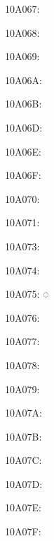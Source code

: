 \begin{multicols}{4}
10A067: 􊁧

10A068: 􊁨

10A069: 􊁩

10A06A: 􊁪

10A06B: 􊁫

10A06D: 􊁭

10A06E: 􊁮

10A06F: 􊁯

10A070: 􊁰

10A071: 􊁱

10A073: 􊁳

10A074: 􊁴

10A075: ◌􊁵

10A076: 􊁶

10A077: 􊁷

10A078: 􊁸

10A079: 􊁹

10A07A: 􊁺

10A07B: 􊁻

10A07C: 􊁼

10A07D: 􊁽

10A07E: 􊁾

10A07F: 􊁿
\end{multicols}
